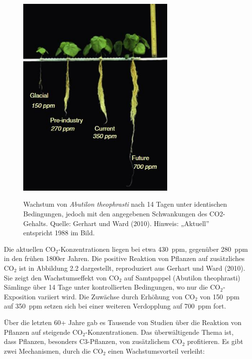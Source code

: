 \documentclass[12pt,paper=a4,DIV=12,parskip=never,chapterprefix=false,headings=standardclasses]{scrreprt}
\begin{document}
\begin{figure}[H]
\begin{center}
\includegraphics[width=0.7\textwidth]{bilder/bilderKlima-0003.jpg}\\[1cm]
\end{center}
\caption{Wachstum von \emph{Abutilon theophrasti} nach 14 Tagen unter identischen Bedingungen, jedoch mit den
angegebenen Schwankungen des CO2-Gehalts. Quelle: Gerhart und Ward (2010). Hinweis: „Aktuell” entspricht
1988 im Bild.}
\end{figure}

Die aktuellen CO$_2$-Konzentrationen liegen bei etwa \SI{430}{ppm}, gegenüber \SI{280}{ppm} in den frühen 1800er Jahren. Die positive Reaktion von Pflanzen auf zusätzliches CO$_2$ ist in Abbildung 2.2 dargestellt, reproduziert aus Gerhart und Ward (2010). Sie zeigt den Wachstumseffekt von CO$_2$ auf Samtpappel (Abutilon theophrasti) Sämlinge über 14 Tage unter kontrollierten Bedingungen, wo nur die CO$_2$-Exposition variiert wird. Die Zuwächse durch Erhöhung von CO$_2$ von \SI{150}{ppm} auf \SI{350}{ppm} setzen sich bei einer weiteren Verdopplung auf \SI{700}{ppm} fort.

Über die letzten 60+ Jahre gab es Tausende von Studien über die Reaktion von Pflanzen auf steigende CO$_2$-Konzentrationen. Das überwältigende Thema ist, dass Pflanzen, besonders C3-Pflanzen, von zusätzlichem CO$_2$ profitieren. Es gibt zwei Mechanismen, durch die CO$_2$ einen Wachstumsvorteil verleiht:
\end{document}
